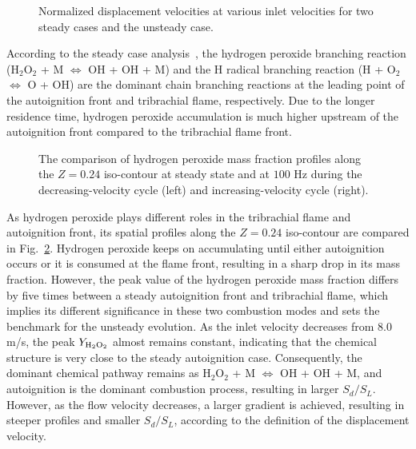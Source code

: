 \documentclass{essci}
\begin{document}
\begin{figure}[t]
  \centering
  \scriptsize
  \resizebox{0.5\textwidth}{!}{}
  \normalsize
  \vspace{-0.2in}
  \caption{Normalized displacement velocities at various inlet velocities for two steady cases and the unsteady case.}
  \label{fig:sd_hys}
\end{figure}

 According to the steady case analysis~\cite{deng15b}, the hydrogen peroxide branching reaction (H$_2$O$_2$ + M $\Longleftrightarrow$ OH + OH + M) and the H radical branching reaction (H + O$_2$ $\Longleftrightarrow$ O + OH) are the dominant chain branching reactions at the leading point of the autoignition front and tribrachial flame, respectively.  Due to the longer residence time, hydrogen peroxide accumulation is much higher upstream of the autoignition front compared to the tribrachial flame front.

\begin{figure}[t]
  \centering
  \scriptsize
  \resizebox{0.49\textwidth}{!}{}
  \resizebox{0.49\textwidth}{!}{}
  \vspace{-0.2in}
  \normalsize
  \caption{The comparison of hydrogen peroxide mass fraction profiles along the $Z = 0.24$ iso-contour at steady state and at $100$ Hz during the decreasing-velocity cycle (left) and increasing-velocity cycle (right).}
  \label{fig:H2O2_updown}
\end{figure}

As hydrogen peroxide plays different roles in the tribrachial flame and autoignition front, its spatial profiles along the $Z = 0.24$ iso-contour are compared in Fig.~\ref{fig:H2O2_updown}.  Hydrogen peroxide keeps on accumulating until either autoignition occurs or it is consumed at the flame front, resulting in a sharp drop in its mass fraction.  However, the peak value of the hydrogen peroxide mass fraction differs by five times between a steady autoignition front and tribrachial flame, which implies its different significance in these two combustion modes and sets the benchmark for the unsteady evolution.  As the inlet velocity decreases from $8.0$ m/s, the peak $Y_{\rm H{_2}O{_2}}$ almost remains constant, indicating that the chemical structure is very close to the steady autoignition case.  Consequently, the dominant chemical pathway remains as H$_2$O$_2$ + M $\Longleftrightarrow$ OH + OH + M, and autoignition is the dominant combustion process, resulting in larger $S_d/S_L$.  However, as the flow velocity decreases, a larger gradient is achieved, resulting in steeper profiles and smaller $S_d/S_L$, according to the definition of the displacement velocity.
\end{document}
